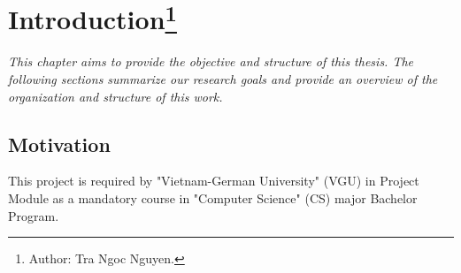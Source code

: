 \chapter{Introduction\footnote{Author: Tra Ngoc Nguyen.}}

\textit{This chapter aims to provide the objective and structure of this thesis.
	The following sections summarize our research goals and provide an overview of the organization and structure of this work.}
\section{Motivation}

This project is required by "Vietnam-German University" (VGU) in Project Module as a mandatory course in "Computer Science" (CS) major Bachelor Program. 
